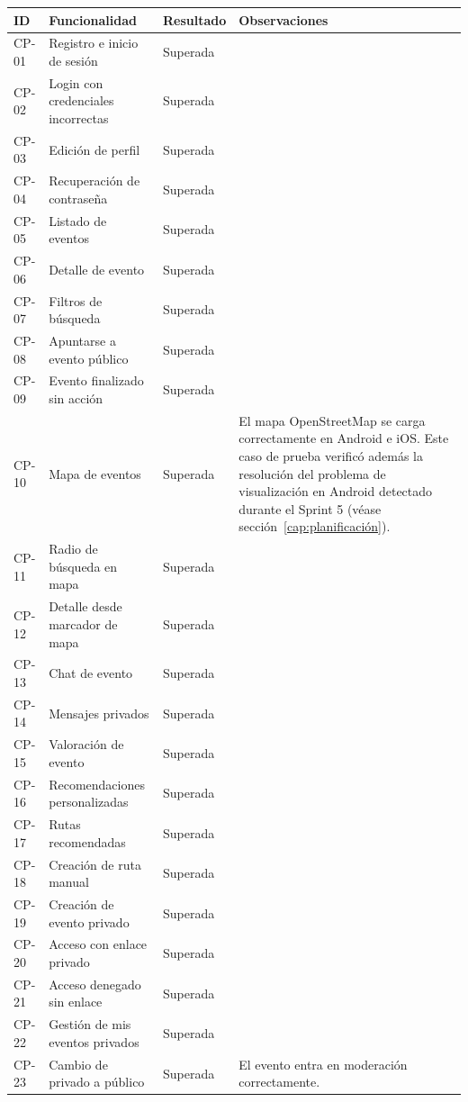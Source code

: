 \begin{longtable}{|L{1.3cm}|L{4.5cm}|L{2.8cm}|L{6cm}|}
\hline
\textbf{ID} & \textbf{Funcionalidad} & \textbf{Resultado} & \textbf{Observaciones} \\
\hline
CP-01 & Registro e inicio de sesión & Superada & \\
\hline
CP-02 & Login con credenciales incorrectas & Superada & \\
\hline
CP-03 & Edición de perfil & Superada & \\
\hline
CP-04 & Recuperación de contraseña & Superada & \\
\hline
CP-05 & Listado de eventos & Superada & \\
\hline
CP-06 & Detalle de evento & Superada & \\
\hline
CP-07 & Filtros de búsqueda & Superada & \\
\hline
CP-08 & Apuntarse a evento público & Superada & \\
\hline
CP-09 & Evento finalizado sin acción & Superada & \\
\hline
CP-10 & Mapa de eventos & Superada & El mapa OpenStreetMap se carga correctamente en Android e iOS. Este caso de prueba verificó además la resolución del problema de visualización en Android detectado durante el Sprint 5 (véase sección~\ref{cap:planificación}). \\
\hline
CP-11 & Radio de búsqueda en mapa & Superada & \\
\hline
CP-12 & Detalle desde marcador de mapa & Superada & \\
\hline
CP-13 & Chat de evento & Superada & \\
\hline
CP-14 & Mensajes privados & Superada & \\
\hline
CP-15 & Valoración de evento & Superada & \\
\hline
CP-16 & Recomendaciones personalizadas & Superada & \\
\hline
CP-17 & Rutas recomendadas & Superada & \\
\hline
CP-18 & Creación de ruta manual & Superada & \\
\hline
CP-19 & Creación de evento privado & Superada & \\
\hline
CP-20 & Acceso con enlace privado & Superada & \\
\hline
CP-21 & Acceso denegado sin enlace & Superada & \\
\hline
CP-22 & Gestión de mis eventos privados & Superada & \\
\hline
CP-23 & Cambio de privado a público & Superada & El evento entra en moderación correctamente. \\

\end{longtable}
